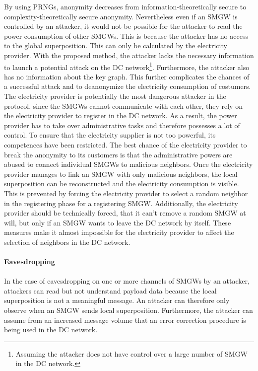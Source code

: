 By using PRNGs, anonymity decreases from information-theoretically secure to complexity-theoretically secure anonymity. Nevertheless even if an SMGW is controlled by an attacker, it would not be possible for the attacker to read the power consumption of other SMGWs. This is because the attacker has no access to the global superposition. This can only be calculated by the electricity provider. With the proposed method, the attacker lacks the necessary information to launch a potential attack on the DC network\footnote[4]{Assuming the attacker does not have control over a large number of SMGW in the DC network.}. Furthermore, the attacker also has no information about the key graph. This further complicates the chances of a successful attack and to deanonymize the electricity consumption of costumers. The electricity provider is potentially the most dangerous attacker in the protocol, since the SMGWs cannot communicate with each other, they rely on the electricity provider to register in the DC network. As a result, the power provider has to take over administrative tasks and therefore possesses a lot of control. To ensure that the electricity supplier is not too powerful, its competences have been restricted. The best chance of the electricity provider to break the anonymity to its customers is that the administrative powers are abused to connect individual SMGWs to malicious neighbors. Once the electricity provider manages to link an SMGW with only malicious neighbors, the local superposition can be reconstructed and the electricity consumption is visible. This is prevented by forcing the electricity provider to select a random neighbor in the registering phase for a registering SMGW. Additionally, the electricity provider should be technically forced, that it can't remove a random SMGW at will, but only if an SMGW wants to leave the DC network by itself. These measures make it almost impossible for the electricity provider to affect the selection of neighbors in the DC network.
\\
\\
\textbf{Eavesdropping}
\\
\\
In the case of eavesdropping on one or more channels of SMGWs by an attacker, attackers can read but not understand payload data because the local superposition is not a meaningful message. An attacker can therefore only observe when an SMGW sends local superposition. Furthermore, the attacker can assume from an increased message volume that an error correction procedure is being used in the DC network. 
